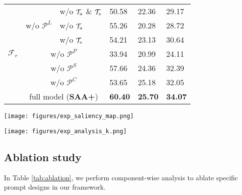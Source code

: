 \documentclass{article}
\makeatletter
\newcommand\figcaption{\def\@captype{figure}\caption}
\makeatother
\begin{document}
\begin{figtab}
\begin{minipage}{0.48\linewidth}
{\begin{tabular}{ccllll}
\multirow{7}[10]{*}{$\mathcal{F}_r$}  & \multirow{3}{*}{w/o $\mathcal{P}^L$} & w/o $\mathcal{T}_{\rm a}$ \& $\mathcal{T}_{\rm s}$ & 50.58          & 22.36          & 29.17          \\
                     &                         & w/o $\mathcal{T}_{\rm a}$       & 55.26          & 20.28          & 28.72          \\
                     &                         & w/o $\mathcal{T}_{\rm s}$       & 54.21          & 23.13          & 30.64          \\ \cmidrule(){2-6}
                     & \multicolumn{2}{c}{w/o $\mathcal{P}^P$}             & 33.94          & 20.99          & 24.11          \\ \cmidrule(){2-6}
                     & \multicolumn{2}{c}{w/o $\mathcal{P}^S$}             & 57.66          & 24.36          & 32.39          \\ \cmidrule(){2-6}
                     & \multicolumn{2}{c}{w/o $\mathcal{P}^C$}             & 53.65          & 25.18          & 32.05          \\ \cmidrule(){2-6}
                     & \multicolumn{2}{c}{full model (\textbf{SAA+})}               & \textbf{60.40} & \textbf{25.70} & \textbf{34.07} \\ \bottomrule
\end{tabular}}\label{tab:ablation}
  \end{minipage}
  \hfill
  \begin{minipage}[t]{0.48\linewidth}
      \vspace{-50mm}
    \centering
    \texttt{[image: figures/exp\_saliency\_map.png]}
    \vspace{-6mm}
    \figcaption{Effects of disabling ($w/o$) and abling ($w/$)  prompts ($\mathcal{P}^{S}$) of saliency maps ($\mathbf{s}$) on the final anomaly segmentation.}
  \label{fig:influence_PS} 
  \vspace{2mm}
    \centering
    \texttt{[image: figures/exp\_analysis\_k.png]}
        \vspace{-1mm}
    \figcaption{Sensitivity analysis of hyperparameter $K$ of confidence prompts ($\mathcal{P}^C$).}
  \label{fig:influence_K}
  \end{minipage}\vspace{-2mm}
\end{figtab}

\subsection{Ablation study}
\label{sec:ablation}
In Table \ref{tab:ablation}, we perform component-wise analysis to ablate specific prompt designs in our framework.
\end{document}
